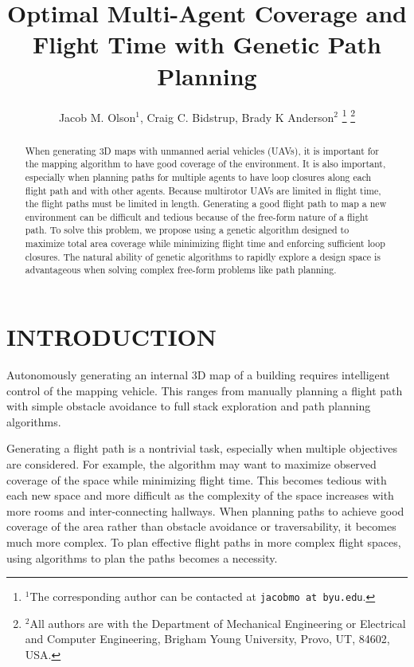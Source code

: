 \documentclass[letterpaper, 10 pt, conference]{ieeeconf}  %
\title{\LARGE \bf
Optimal Multi-Agent Coverage and Flight Time with Genetic Path Planning
}
\author{Jacob M. Olson$^{1}$, Craig C. Bidstrup, Brady K Anderson$^{2}$%
\thanks{$^{1}$The corresponding author can be contacted at
        {\tt\small jacobmo at byu.edu}.}%
\thanks{$^{2}$All authors are with the Department of Mechanical Engineering or Electrical and Computer Engineering,
        Brigham Young University, Provo, UT, 84602, USA.}%
}
\begin{document}
\maketitle
\thispagestyle{empty}
\pagestyle{empty}


\begin{abstract}

When generating 3D maps with unmanned aerial vehicles (UAVs), it is important for the mapping algorithm to have good coverage of the environment. It is also important, especially when planning paths for multiple agents to have loop closures along each flight path and with other agents. Because multirotor UAVs are limited in flight time, the flight paths must be limited in length. Generating a good flight path to map a new environment can be difficult and tedious because of the free-form nature of a flight path. To solve this problem, we propose using a genetic algorithm designed to maximize total area coverage while minimizing flight time and enforcing sufficient loop closures. The natural ability of genetic algorithms to rapidly explore a design space is advantageous when solving complex free-form problems like path planning.

\end{abstract}


\section{INTRODUCTION}


Autonomously generating an internal 3D map of a building requires intelligent control of the mapping vehicle. This ranges from manually planning a flight path with simple obstacle avoidance to full stack exploration and path planning algorithms.

Generating a flight path is a nontrivial task, especially when multiple objectives are considered. For example, the algorithm may want to maximize observed coverage of the space while minimizing flight time. This becomes tedious with each new space and more difficult as the complexity of the space increases with more rooms and inter-connecting hallways. When planning paths to achieve good coverage of the area rather than obstacle avoidance or traversability, it becomes much more complex. To plan effective flight paths in more complex flight spaces, using algorithms to plan the paths becomes a necessity.
\end{document}
